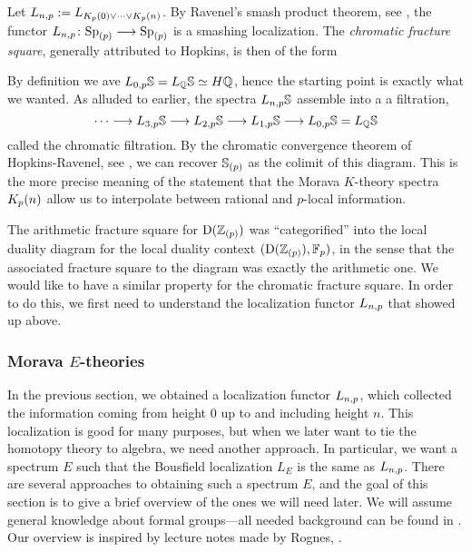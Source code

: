 \begin{construction}
    Let $L\np := L_{K_p(0)\vee \cdots \vee \Kpn}$. By Ravenel's smash product theorem, see \cite[7.5.6]{ravenel_92}, the functor $L\np\colon \Sp_{(p)}\longrightarrow \Sp_{(p)}$ is a smashing localization. The \emph{chromatic fracture square}, generally attributed to Hopkins, is then of the form 
    \begin{center}
    \end{center}
    By definition we ave $L_{0,p} \S = L_\Q \S \simeq H\Q$, hence the starting point is exactly what we wanted. As alluded to earlier, the spectra $L\np\S$ assemble into a a filtration, 
    \[\cdots \longrightarrow L_{3,p}\S \longrightarrow L_{2,p}\S \longrightarrow L_{1,p}\S \longrightarrow L_{0,p} \S = L_\Q\S\]
    called the chromatic filtration. By the chromatic convergence theorem of Hopkins-Ravenel, see \cite[7.5.7]{ravenel_92}, we can recover $\S_{(p)}$ as the colimit of this diagram. This is the more precise meaning of the statement that the Morava $K$-theory spectra $\Kpn$ allow us to interpolate between rational and $p$-local information. 
\end{construction}

\begin{remark}
    \label{ch0:rm:chromatic-square-from-duality}
    The arithmetic fracture square for $\Der(\Z_{(p)})$ was ``categorified'' into the local duality diagram for the local duality context $(\Der(\Z_{(p)}), \F_p)$, in the sense that the associated fracture square to the diagram was exactly the arithmetic one. We would like to have a similar property for the chromatic fracture square. In order to do this, we first need to understand the localization functor $L\np$ that showed up above. 
\end{remark}  






\subsubsection{Morava \texorpdfstring{$E$}{E}-theories}
\label{ch0:sssec:morava-E-theories}

In the previous section, we obtained a localization functor $L\np$, which collected the information coming from height $0$ up to and including height $n$. This localization is good for many purposes, but when we later want to tie the homotopy theory to algebra, we need another approach. In particular, we want a spectrum $E$ such that the Bousfield localization $L_E$ is the same as $L\np$. There are several approaches to obtaining such a spectrum $E$, and the goal of this section is to give a brief overview of the ones we will need later. We will assume general knowledge about formal groups---all needed background can be found in \cite[Appendix 2]{ravenel_86}. Our overview is inspired by lecture notes made by Rognes, \cite{rognes_2023}. 

